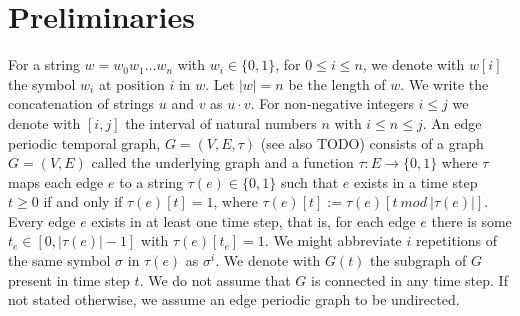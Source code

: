 \chapter{Preliminaries}
\label{ch:Preliminaries}

For a string $w = w_0w_1 \dots w_n$ with $w_i \in \{0, 1\}$, for $0 \leq i \leq n$, we denote with $w[i]$ the symbol $w_i$ at position $i$ in $w$. Let $|w| = n$ be the length of $w$. We write the concatenation of strings $u$ and $v$ as $u \cdot v$. For non-negative integers $i \leq j$ we denote with $[i, j]$ the interval of natural numbers $n$ with $i \leq n \leq j$. 
An edge periodic temporal graph, $G = (V, E, \tau)$ (see also TODO) consists of a graph $G = (V, E)$ called the underlying graph and a function $\tau : E \rightarrow \{0, 1\}$ where $\tau$ maps each edge $e$ to a string $\tau(e) \in \{0, 1\}$
such that $e$ exists in a time step $t \geq 0$ if and only if $\tau(e)[t] = 1$, where $\tau(e)[t] := \tau(e)[t~ mod~ |\tau(e)|]$.
Every edge $e$ exists in at least one time step, that is, for each edge $e$ there is some $t_e \in [0, |\tau(e)| - 1]$ with $\tau(e)[t_e] = 1$. We might abbreviate $i$ repetitions of the same symbol $\sigma$ in $\tau(e)$ as $\sigma^i$.
We denote with $G(t)$ the subgraph of $G$ present in time step $t$. We do not assume that $G$ is connected in any time step. If not stated otherwise, we assume an edge periodic graph to be undirected.
